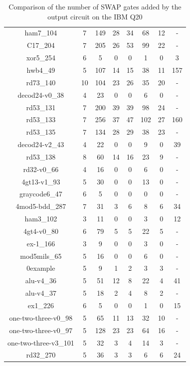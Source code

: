 \documentclass[runningheads]{llncs}
\begin{document}
\begin{table}[H]
\begin{center}
\begin{tabular}{|c|c|c|c|c|c|c|c|}
ham7\_104 & 7 & 149 & 28 & 34 & 68 & 12& - 	\\
C17\_204 & 7 & 205 & 26 & 53 & 99 & 22& - 	\\
xor5\_254 & 6 & 5 & 0 & 0 & 1 & 0& 3	\\
hwb4\_49 & 5 & 107 & 14 & 15 & 38 & 11& 157 	\\
rd73\_140 & 10 & 104 & 23 & 26 & 35 & 20& - 	\\
decod24-v0\_38 & 4 & 23 & 0 & 0 & 6 & 0& - 	\\
rd53\_131 & 7 & 200 & 39 & 39 & 98 & 24& - 	\\
rd53\_133 & 7 & 256 & 37 & 47 & 102 & 27& 160 	\\
rd53\_135 & 7 & 134 & 28 & 29 & 38 & 23& - 	\\
decod24-v2\_43 & 4 & 22 & 0 & 0 & 9 & 0& 39 \\
rd53\_138 & 8 & 60 & 14 & 16 & 23 & 9& - \\
rd32-v0\_66 & 4 & 16 & 0 & 0 & 6 & 0& - \\
4gt13-v1\_93 & 5 & 30 & 0 & 0 & 13 & 0& - \\
graycode6\_47 & 6 & 5 & 0 & 0 & 0 & 0& - \\
4mod5-bdd\_287 & 7 & 31 & 3 & 6 & 8 & 6& 34 \\
ham3\_102 & 3 & 11 & 0 & 0 & 3 & 0& 12 \\
4gt4-v0\_80 & 6 & 79 & 5 & 5 & 22 & 5& - \\
ex-1\_166 & 3 & 9 & 0 & 0 & 3 & 0& - \\
mod5mils\_65 & 5 & 16 & 0 & 0 & 6 & 0& - \\
0example & 5 & 9 & 1 & 2 & 3 & 3& - \\
alu-v4\_36 & 5 & 51 & 12 & 8 & 22 & 4& 41 \\
alu-v4\_37 & 5 & 18 & 2 & 4 & 8 & 2& - \\
ex1\_226 & 6 & 5 & 0 & 0 & 1 & 0& 15 \\
one-two-three-v0\_98 & 5 & 65 & 11 & 13 & 32 & 10& - \\
one-two-three-v0\_97 & 5 & 128 & 23 & 23 & 64 & 16& - \\
one-two-three-v3\_101 & 5 & 32 & 3 & 4 & 14 & 3& - \\
rd32\_270 & 5 & 36 & 3 & 3 & 6 & 6 &24\\
\hline
	\end{tabular} 
	\end{center}
	\caption{Comparison of  the number of SWAP gates added by the 
	output circuit on the IBM Q20 } 
	\label{tab2}
	\end{table}
\end{document}
